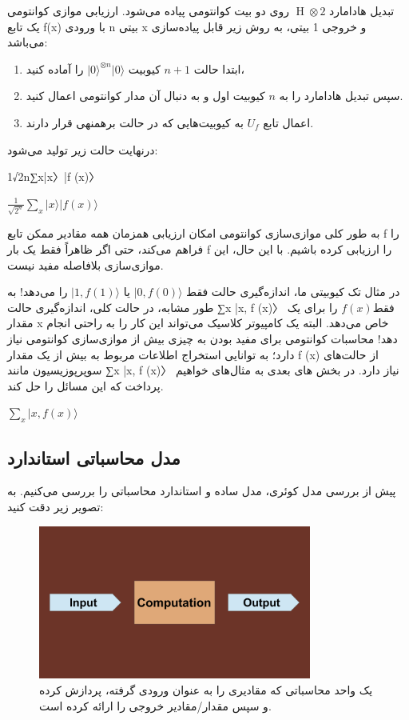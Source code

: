 \documentclass{book}
\begin{document}
تبدیل هادامارد $\operatorname{H} \otimes 2$ روی دو بیت کوانتومی پیاده می‌شود. ارزیابی موازی کوانتومی یک تابع f(x) با ورودی n بیتی x و خروجی 1 بیتی، به روش زیر قابل پیاده‌سازی می‌باشد:

\begin{enumerate}
	\item ابتدا حالت $n + 1$ کیوبیت $\vert0\rangle^{\otimes n} \vert 0\rangle$ را آماده کنید،
	\item سپس تبدیل هادامارد را به $n$ کیوبیت اول و به دنبال آن مدار کوانتومی اعمال کنید.
	\item اعمال تابع $U_{f}$ به کیوبیت‌هایی که در حالت برهمنهی قرار دارند.
\end{enumerate}
درنهایت حالت زیر تولید ‌می‌شود:

1√2n∑x|x〉|f (x)〉

\begin{center}
	$\frac{1}{\sqrt{2^n}} \sum_{x} \vert x \rangle \vert f (x)\rangle$ 
\end{center}


به طور کلی موازی‌سازی کوانتومی امکان ارزیابی همزمان همه مقادیر ممکن تابع f را فراهم می‌کند، حتی اگر ظاهراً فقط یک بار f را ارزیابی کرده باشیم. با این حال، این موازی‌سازی بلافاصله مفید نیست. 


در مثال تک کیوبیتی ما، اندازه‌گیری حالت فقط $\vert 0, f(0)\rangle$ یا $\vert 1, f(1)\rangle$ را می‌دهد! به طور مشابه، در حالت کلی، اندازه‌گیری حالت ∑x |x, f (x)〉 فقط$ f (x)$ را برای یک مقدار x خاص می‌دهد. البته یک کامپیوتر کلاسیک می‌تواند این کار را به راحتی انجام دهد! محاسبات کوانتومی برای مفید بودن به چیزی بیش از موازی‌سازی کوانتومی نیاز دارد؛ به توانایی استخراج اطلاعات مربوط به بیش از یک مقدار f (x) از حالت‌های سوپرپوزیسیون مانند ∑x |x, f (x)〉 نیاز دارد. 
در بخش های بعدی به مثال‌های خواهیم پرداخت که این مسائل را حل کند.



$\sum_{x} \vert x, f(x)\rangle$

\newpage
\subsection{مدل محاسباتی استاندارد}
پیش از بررسی مدل کوئری،‌ مدل ساده و استاندارد محاسباتی را بررسی می‌کنیم. به تصویر زیر دقت کنید:

\begin{figure}[ht]
	\centering
	\includegraphics[width=0.8\textwidth]{standard computation model.png}
	\caption{یک واحد محاسباتی که مقادیری را به عنوان ورودی گرفته، پردازش کرده و سپس مقدار/مقادیر خروجی را ارائه کرده است.}
\end{figure}
\end{document}
